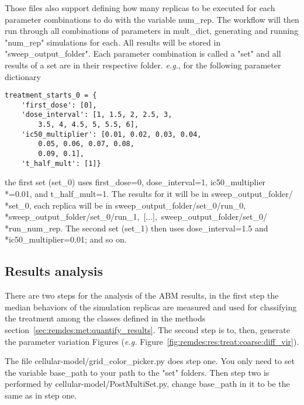 Those files also support defining how many replicas to be executed for each parameter combinations to do with the variable {\selectfont num\_rep}. The workflow will then run through all combinations of parameters in mult\_dict, generating and running "{\selectfont num\_rep}" simulations for each. All results will be stored in "{\selectfont sweep\_output\_folder}". Each parameter combination is called a "set" and all results of a set are in their respective folder. \emph{e.g.}, for the following parameter dictionary

\begin{verbatim}
treatment_starts_0 = {
    'first_dose': [0],
    'dose_interval': [1, 1.5, 2, 2.5, 3,
        3.5, 4, 4.5, 5, 5.5, 6],
    'ic50_multiplier': [0.01, 0.02, 0.03, 0.04,
        0.05, 0.06, 0.07, 0.08,
        0.09, 0.1],
    't_half_mult': [1]}
\end{verbatim}

\noindent the first set ({\selectfont set\_0}) uses {\selectfont first\_dose=0}, {\selectfont dose\_interval=1}, {\selectfont ic50\_multiplier\\*=0.01}, and {\selectfont t\_half\_mult=1}. The results for it will be in {\selectfont sweep\_output\_folder/\\*set\_0}, each replica will be in {\selectfont sweep\_output\_folder/set\_0/run\_0},\, \\*{\selectfont sweep\_output\_folder/set\_0/run\_1},\, [...],\, {\selectfont sweep\_output\_folder/set\_0/\\*run\_num\_rep}. The second set ({\selectfont set\_1}) then uses {\selectfont dose\_interval=1.5} and \\*{\selectfont ic50\_multiplier=0.01}; and so on.

\subsection{Results analysis}

There are two steps for the analysis of the ABM results, in the first step the median behaviors of the simulation replicas are measured and used for classifying the treatment among the classes defined in the methods section~\ref{sec:remdes:met:quantify_results}. The second step is to, then, generate the parameter variation Figures (\emph{e.g.} Figure~\ref{fig:remdes:res:treat:coarse:diff_vir}).

The file {\selectfont cellular-model/grid\_color\_picker.py} does step one. You only need to set the variable {\selectfont base\_path} to your path to the "set" folders. Then step two is performed by {\selectfont cellular-model/PostMultiSet.py}, change {\selectfont base\_path} in it to be the same as in step one.
